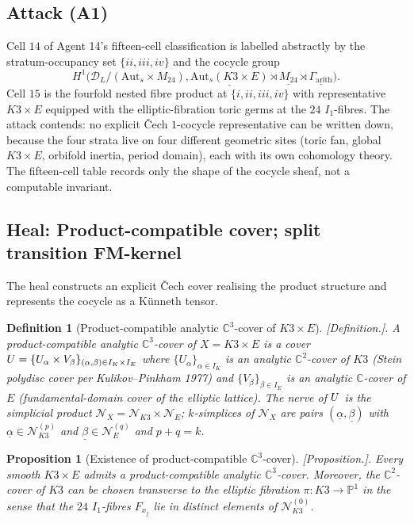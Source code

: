 \documentclass[11pt]{amsart}
\newtheorem{proposition}[theorem]{Proposition}
\newtheorem{definition}[theorem]{Definition}
\providecommand{\C}{\mathbb{C}}
\providecommand{\Aut}{\mathrm{Aut}}
\providecommand{\cN}{\mathcal{N}}
\providecommand{\cD}{\mathcal{D}}
\providecommand{\ClaimStatusProposition}{[\emph{Proposition.}]}
\providecommand{\ClaimStatusDefinition}{[\emph{Definition.}]}
\begin{document}
\subsection*{Attack (A1)}

Cell $14$ of Agent 14's fifteen-cell classification is labelled
abstractly by the stratum-occupancy set $\{ii, iii, iv\}$ and the
cocycle group
\[
  H^1 \bigl( \cD_L / (\Aut_s \times M_{24}),
  \underline{\Aut_s(K3 \times E)} \rtimes \underline{M_{24}} \rtimes
  \underline{\Gamma_{\mathrm{arith}}} \bigr).
\]
Cell $15$ is the fourfold nested fibre product at $\{i, ii, iii, iv\}$
with representative $K3 \times E$ equipped with the elliptic-fibration
toric germs at the $24$ $I_1$-fibres. The attack contends: no explicit
\v{C}ech $1$-cocycle representative can be written down, because the
four strata live on four different geometric sites (toric fan, global
$K3 \times E$, orbifold inertia, period domain), each with its own
cohomology theory. The fifteen-cell table records only the shape of
the cocycle sheaf, not a computable invariant.

\subsection*{Heal: Product-compatible cover; split transition FM-kernel}

The heal constructs an explicit \v{C}ech cover realising the product
structure and represents the cocycle as a K\"{u}nneth tensor.

\begin{definition}[Product-compatible analytic $\C^3$-cover of $K3 \times E$]
\label{def:R13-product-cover}
\ClaimStatusDefinition.
A product-compatible analytic $\C^3$-cover of $X = K3 \times E$ is a
cover $U = \{U_\alpha \times V_\beta\}_{(\alpha, \beta) \in
I_K \times I_E}$ where $\{U_\alpha\}_{\alpha \in I_K}$ is an analytic
$\C^2$-cover of $K3$ (Stein polydisc cover per Kulikov--Pinkham 1977)
and $\{V_\beta\}_{\beta \in I_E}$ is an analytic $\C$-cover of $E$
(fundamental-domain cover of the elliptic lattice). The nerve of
$U$ is the simplicial product
$\cN_X = \cN_{K3} \times \cN_E$; $k$-simplices of $\cN_X$ are pairs
$(\underline{\alpha}, \underline{\beta})$ with
$\underline{\alpha} \in \cN_{K3}^{(p)}$ and
$\underline{\beta} \in \cN_E^{(q)}$ and $p + q = k$.
\end{definition}

\begin{proposition}[Existence of product-compatible $\C^3$-cover]
\label{prop:R13-cover-existence}
\ClaimStatusProposition.
Every smooth $K3 \times E$ admits a product-compatible analytic
$\C^3$-cover. Moreover, the $\C^2$-cover of $K3$ can be chosen
transverse to the elliptic fibration $\pi: K3 \to \mathbb{P}^1$ in the
sense that the $24$ $I_1$-fibres $F_{x_j}$ lie in distinct
elements of $\cN_{K3}^{(0)}$.
\end{proposition}
\end{document}
